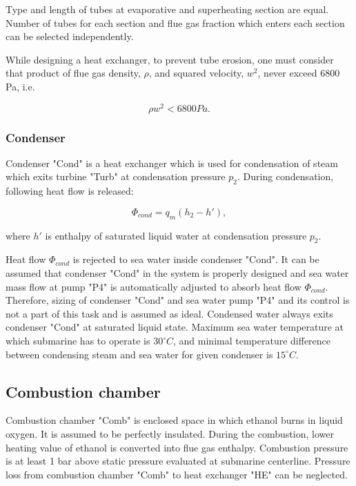\documentclass{article}
\begin{document}
	Type and length of tubes at evaporative and superheating section are equal. Number of tubes for each section and flue gas fraction which enters each section can be selected independently.  
	
	While designing a heat exchanger, to prevent tube erosion, one must 
	consider that product of flue gas density, $\rho$, and squared velocity, 
	$w^2$, never exceed $6800$  Pa,  i.e. 
	
	\begin{equation}\label{eq:flue_gas_density}
		\rho w^2 < 6800 Pa.
	\end{equation}
	
	\subsubsection*{Condenser}
	
	\noindent
	Condenser "Cond" is a heat exchanger which is used for condensation of steam which exits turbine "Turb" at condensation pressure $p_2$. During condensation, following heat flow is released:
	
	\begin{equation}\label{eq:heat_flow_cond}
		\Phi_{cond} = q_m (h_2 - h'),
	\end{equation}
	
	\noindent
	where $h'$ is enthalpy of saturated liquid water at condensation pressure $p_2$.
	
	\noindent
	Heat flow $\Phi_{cond}$ is rejected to sea water inside condenser "Cond". 
	It can be assumed that condenser "Cond" in the system is properly designed 
	and sea water mass flow at pump "P4" is automatically adjusted to absorb 
	heat flow $\Phi_{cond}$. Therefore, sizing of condenser "Cond" and sea 
	water pump "P4" and its control is not a part of this task and is assumed 
	as ideal. Condensed water always exits condenser "Cond" at saturated liquid 
	state.
	Maximum sea water temperature at which submarine has to operate is $30^{\circ}C$, and minimal temperature difference between condensing steam and sea water for given condenser is $15^{\circ}C$. 
	
	\subsection{Combustion chamber}
	
	Combustion chamber "Comb" is enclosed space in which ethanol burns in liquid oxygen. It is assumed to be perfectly insulated. During the combustion, lower heating value of ethanol is converted into flue gas enthalpy. Combustion pressure is at least 1 bar above static pressure evaluated at submarine centerline. Pressure loss from combustion chamber "Comb" to heat exchanger "HE" can be neglected.
	
\end{document}
